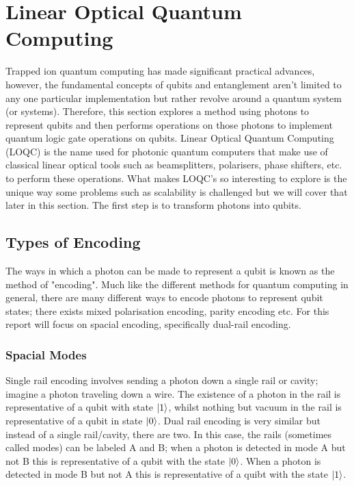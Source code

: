 
\section{Linear Optical Quantum Computing}\label{sec:Photonic}
Trapped ion quantum computing has made significant practical advances, however, the fundamental concepts of qubits and entanglement aren't limited to any one particular implementation but rather revolve around a quantum system (or systems). Therefore, this section explores a method using photons to represent qubits and then performs operations on those photons to implement quantum logic gate operations on qubits. Linear Optical Quantum Computing (LOQC) is the name used for photonic quantum computers that make use of classical linear optical tools such as beamsplitters, polarisers, phase shifters, etc. to perform these operations. What makes LOQC's so interesting to explore is the unique way some problems such as scalability is challenged but we will cover that later in this section. The first step is to transform photons into qubits.

\subsection{Types of Encoding}
The ways in which a photon can be made to represent a qubit is known as the method of "encoding". Much like the different methods for quantum computing in general, there are many different ways to encode photons to represent qubit states; there exists mixed polarisation encoding, parity encoding etc. For this report will focus on spacial encoding, specifically dual-rail encoding. 

\subsubsection{Spacial Modes}\label{sec:modes}
Single rail encoding involves sending a photon down a single rail or cavity; imagine a photon traveling down a wire. The existence of a photon in the rail is representative of a qubit with state $\ket{1}$, whilst nothing but vacuum in the rail is representative of a qubit in state $\ket{0}$. Dual rail encoding is very similar but instead of a single rail/cavity, there are two. In this case, the rails (sometimes called modes) can be labeled A and B; when a photon is detected in mode A but not B this is representative of a qubit with the state $\ket{0}$. When a photon is detected in mode B but not A this is representative of a quibt with the state $\ket{1}$. 

